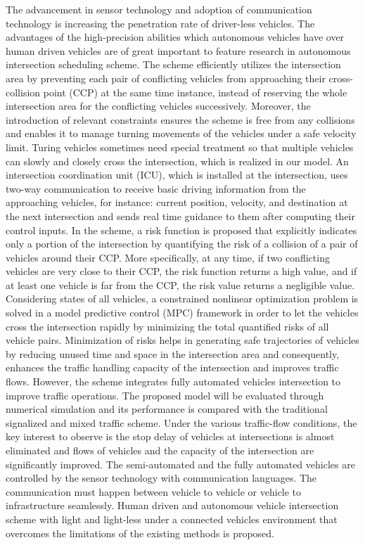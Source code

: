 \documentclass{book}
\begin{document}
The advancement in sensor technology and adoption of communication technology is increasing the penetration rate of driver-less vehicles. The advantages of the high-precision abilities which autonomous vehicles have over human driven vehicles are of great important to feature research in autonomous intersection scheduling scheme.	The scheme efficiently utilizes the intersection area by preventing each pair of conflicting vehicles from approaching their cross-collision point (CCP) at the same time instance, instead of reserving the whole intersection area for the conflicting vehicles successively. Moreover, the introduction of relevant constraints ensures the scheme is free from any collisions and enables it to manage turning movements of the vehicles under a safe velocity limit. Turing vehicles sometimes need special treatment so that multiple vehicles can slowly and closely cross the intersection, which is realized in our model. An intersection coordination unit (ICU), which is installed at the intersection, uses two-way communication to receive basic driving information from the approaching vehicles, for instance: current position, velocity, and destination at the next intersection and sends real time guidance to them after computing their control inputs. 	In the scheme, a risk function is proposed that explicitly indicates only a portion of the intersection by quantifying the risk of a collision of a pair of vehicles around their CCP. More specifically, at any time, if two conflicting vehicles are very close to their CCP, the risk function returns a high value, and if at least one vehicle is far from the CCP, the risk value returns a negligible value. Considering states of all vehicles, a constrained nonlinear optimization problem is solved in a model predictive control (MPC) framework in order to let the vehicles cross the intersection rapidly by minimizing the total quantified risks of all vehicle pairs. Minimization of risks helps in generating safe trajectories of vehicles by reducing unused time and space in the intersection area and consequently, enhances the traffic handling capacity of the intersection and improves traffic flows. However, the scheme integrates fully automated vehicles intersection to improve traffic operations. The proposed model will be evaluated through numerical simulation and its performance is compared with the traditional signalized and mixed traffic scheme. Under the various traffic-flow conditions, the key interest to observe is the stop delay of vehicles at intersections is almost eliminated and flows of vehicles and the capacity of the intersection are significantly improved.  The semi-automated and the fully automated vehicles are controlled by the sensor technology with  communication languages. The communication must happen between vehicle to vehicle or vehicle to infrastructure seamlessly. Human driven and autonomous vehicle intersection scheme with light and light-less under a connected vehicles environment that overcomes the limitations of the existing methods is proposed.\\
\end{document}
